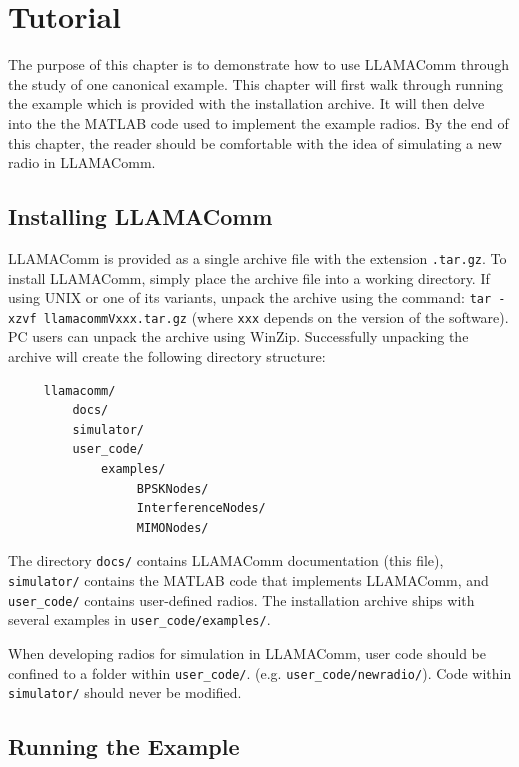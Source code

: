 \chapter{Tutorial} \label{chp:tutorial}

The purpose of this chapter is to demonstrate how to use LLAMAComm
through the study of one canonical example.  This chapter will first
walk through running the example which is provided with the
installation archive.  It will then delve into the the MATLAB code
used to implement the example radios.  By the end of this chapter,
the reader should be comfortable with the idea of simulating a new
radio in LLAMAComm.

\section{Installing LLAMAComm}

LLAMAComm is provided as a single archive file with the extension
\verb+.tar.gz+.  To install LLAMAComm, simply place the archive file
into a working directory.  If using UNIX or one of its variants,
unpack the archive using the command: \verb+tar -xzvf llamacommVxxx.tar.gz+
(where \verb+xxx+ depends on the version of
the software).  PC users can unpack the archive using WinZip.
Successfully unpacking the archive will create the following
directory structure:

\begin{verbatim}
     llamacomm/
         docs/
         simulator/
         user_code/
             examples/
                  BPSKNodes/
                  InterferenceNodes/
                  MIMONodes/
\end{verbatim}

The directory \verb+docs/+ contains LLAMAComm documentation (this
file), \verb+simulator/+ contains the MATLAB code that implements
LLAMAComm, and \verb+user_code/+ contains user-defined radios.  The
installation archive ships with several examples in \verb+user_code/examples/+.

When developing radios for simulation in LLAMAComm, user code should
be confined to a folder within \verb+user_code/+. (e.g.
\verb+user_code/newradio/+).  
Code within
\verb+simulator/+ should never be modified.

\section{Running the Example}

